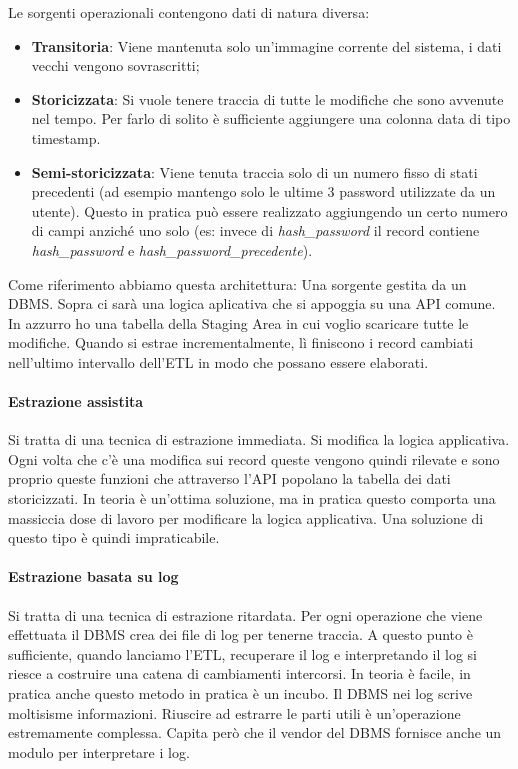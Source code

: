 \noindent Le sorgenti operazionali contengono dati di natura diversa:
\begin{itemize}
	\item \textbf{Transitoria}: Viene mantenuta solo un'immagine corrente del sistema, i  dati vecchi vengono sovrascritti;
	\item \textbf{Storicizzata}: Si vuole tenere traccia di tutte le modifiche che sono avvenute nel tempo. Per farlo di solito è sufficiente  aggiungere una colonna data di tipo timestamp.
	\item \textbf{Semi-storicizzata}: Viene tenuta traccia solo di un numero fisso di stati precedenti (ad esempio mantengo solo le ultime 3 password utilizzate da un utente). Questo in pratica può essere realizzato aggiungendo un certo numero di campi anziché uno solo (es: invece di \textit{hash\_password} il record contiene \textit{hash\_password} e \textit{hash\_password\_precedente}).
\end{itemize}

Come riferimento abbiamo questa architettura:\newline
Una sorgente gestita da un DBMS. Sopra ci sarà una logica aplicativa che si appoggia su una API comune. In azzurro ho una tabella della Staging Area in cui voglio scaricare tutte le modifiche. Quando si estrae incrementalmente, lì finiscono i record cambiati nell'ultimo intervallo dell'ETL in modo che possano essere elaborati.

\paragraph{Estrazione assistita}
Si tratta di una tecnica di estrazione immediata. Si modifica la logica applicativa. Ogni volta che c'è una modifica sui record queste vengono quindi rilevate e sono proprio queste funzioni che attraverso l'API popolano la tabella dei dati storicizzati. In teoria è un'ottima soluzione, ma in pratica questo comporta una massiccia dose di lavoro per modificare la logica applicativa. Una soluzione di questo tipo è quindi impraticabile.


\paragraph{Estrazione basata su log}
Si tratta di una tecnica di estrazione ritardata. Per ogni operazione che viene effettuata il DBMS crea dei file di log per tenerne traccia. A questo punto è sufficiente, quando lanciamo l'ETL, recuperare il log e interpretando il log si riesce a costruire una catena di cambiamenti intercorsi. In teoria è facile, in pratica anche questo metodo in pratica è un incubo. Il DBMS nei log scrive moltisisme informazioni. Riuscire ad estrarre le parti utili è un'operazione estremamente complessa. Capita però che il vendor del DBMS fornisce anche un modulo per interpretare i log.

